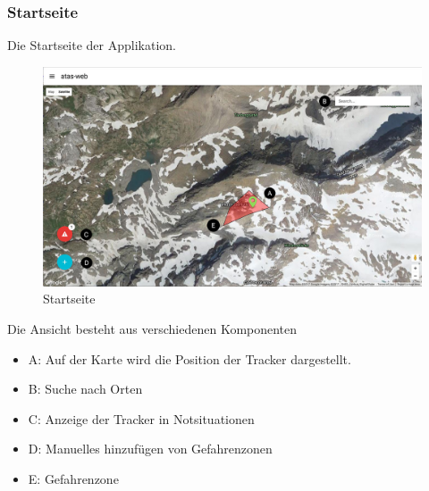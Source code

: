 \documentclass[11pt,english,german]{report}
\theoremstyle{definition}
\begin{document}
\subsubsection{Startseite}
Die Startseite der Applikation.
\begin{figure}[H]
	\centering
	\includegraphics[width=\textwidth]{img/atasweb/atas-web.jpg}
	\caption[Startseite]
	{Startseite}
\end{figure}
Die Ansicht besteht aus verschiedenen Komponenten
\begin{itemize}
	\item A: Auf der Karte wird die Position der Tracker dargestellt. 
	\item B: Suche nach Orten
	\item C: Anzeige der Tracker in Notsituationen
	\item D: Manuelles hinzufügen von Gefahrenzonen
	\item E: Gefahrenzone
\end{itemize}

\newpage
\end{document}
